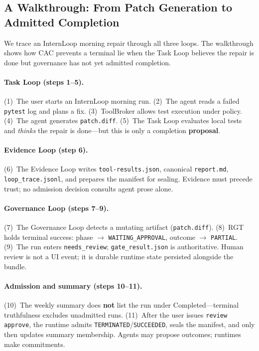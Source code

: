 \documentclass[11pt]{article}
\newcommand{\cac}{\textsc{CAC}}
\newcommand{\rgt}{\textsc{RGT}}
\begin{document}
\subsection{A Walkthrough: From Patch Generation to Admitted Completion}
\label{sec:walkthrough}

We trace an InternLoop morning repair through all three loops.
The walkthrough shows how \cac{} prevents a terminal lie when the Task Loop believes the repair is done but governance has not yet admitted completion.

\paragraph{Task Loop (steps 1--5).}
(1)~The user starts an InternLoop morning run.
(2)~The agent reads a failed \texttt{pytest} log and plans a fix.
(3)~ToolBroker allows test execution under policy.
(4)~The agent generates \texttt{patch.diff}.
(5)~The Task Loop evaluates local tests and \emph{thinks} the repair is done---but this is only a completion \textbf{proposal}.

\paragraph{Evidence Loop (step 6).}
(6)~The Evidence Loop writes \texttt{tool-results.json}, canonical \texttt{report.md}, \texttt{loop\_trace.jsonl}, and prepares the manifest for sealing.
Evidence must precede trust; no admission decision consults agent prose alone.

\paragraph{Governance Loop (steps 7--9).}
(7)~The Governance Loop detects a mutating artifact (\texttt{patch.diff}).
(8)~\rgt{} holds terminal success: phase $\rightarrow$ \texttt{WAITING\_APPROVAL}, outcome $\rightarrow$ \texttt{PARTIAL}.
(9)~The run enters \texttt{needs\_review}; \texttt{gate\_result.json} is authoritative.
Human review is not a UI event; it is durable runtime state persisted alongside the bundle.

\paragraph{Admission and summary (steps 10--11).}
(10)~The weekly summary does \textbf{not} list the run under Completed---terminal truthfulness excludes unadmitted runs.
(11)~After the user issues \texttt{review approve}, the runtime admits \texttt{TERMINATED}/\texttt{SUCCEEDED}, seals the manifest, and only then updates summary membership.
Agents may propose outcomes; runtimes make commitments.
\end{document}
